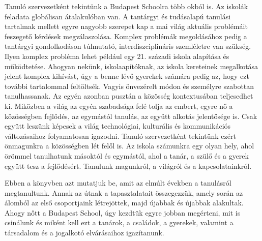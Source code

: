 Tanuló szervezetként tekintünk a Budapest Schoolra több okból is. Az iskolák feladata globálisan átalakulóban van. A tantárgyi és tudásalapú tanulási tartalmak mellett egyre nagyobb szerepet kap a mai világ aktuális problémáit feszegető kérdések megválaszolása. Komplex problémák megoldásához pedig a tantárgyi gondolkodáson túlmutató, interdiszciplináris szemléletre van szükség. Ilyen komplex probléma lehet például egy 21. századi iskola alapítása és működtetése. Ahogyan nekünk, iskolaapítóknak, az iskola kereteinek megalkotása jelent komplex kihívást, úgy a benne lévő gyerekek számára pedig az, hogy ezt további tartalommal feltöltsék. Vagyis önvezérelt módon és személyre szabottan tanulhassanak. Az egyén azonban pusztán a közösség kontextusában teljesedhet ki. Miközben a világ az egyén szabadsága felé tolja az embert, egyre nő a közösségben fejlődés, az egymástól tanulás, az együtt alkotás jelentősége is. Csak együtt leszünk képesek a világ technológiai, kulturális és kommunikációs változásaihoz folyamatosan igazodni. Tanuló szervezetként tekintünk ezért önmagunkra a közösségben lét felől is. Az iskola számunkra egy olyan hely, ahol örömmel tanulhatunk másoktól és egymástól, ahol a tanár, a szülő és a gyerek együtt tesz a fejlődésért. Tanulunk magunkról, a világról és a kapcsolatainkról.

Ebben a könyvben azt mutatjuk be, amit az elmúlt években a tanulásról megtanultunk. Annak az útnak a tapasztalatait összegezzük, amely során az álomból az első csoportjaink létrejöttek, majd újabbak és újabbak alakultak. Ahogy nőtt a Budapest School, úgy kezdtük egyre jobban megérteni, mit is csinálunk és miként kell ezt a tanárok, a családok, a gyerekek, valamint a társadalom és a jogalkotó elvárásaihoz igazítanunk. 


